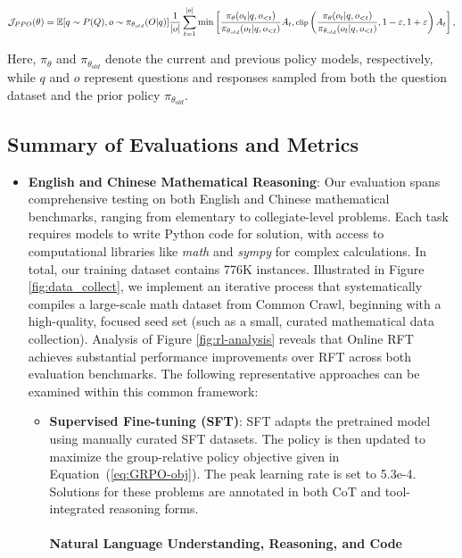 \begin{itemize}[topsep=0pt]
\begin{itemize}[topsep=0pt]
\begin{itemize}[topsep=0pt]
\begin{equation}
\begin{equation}
\footnotesize
            \mathcal{J}_{PPO}(\theta) = \mathbb{E}{[q \sim P(Q), o \sim \pi_{\theta_{old}}(O|q)]} \frac{1}{|o|} \sum_{t=1}^{|o|} \min \left[ \frac{\pi_\theta(o_{t} | q, o_{<t})}{\pi_{\theta_{old}}(o_{t} | q, o_{<t})} A_{t}, \text{clip} \left( \frac{\pi_\theta(o_{t} | q, o_{<t})}{\pi_{\theta_{old}}(o_{t} | q, o_{<t})}, 1 - \varepsilon, 1 + \varepsilon \right)  A_{t} \right] ,
\end{equation}

Here, $\pi_{\theta}$ and $\pi_{\theta_{old}}$ denote the current and previous policy models, respectively, while $q$ and $o$ represent questions and responses sampled from both the question dataset and the prior policy $\pi_{\theta_{old}}$. \end{itemize}

\subsection{Summary of Evaluations and Metrics}

\begin{itemize}[topsep=0pt]
    \item \textbf{English and Chinese Mathematical Reasoning}: Our evaluation spans comprehensive testing on both English and Chinese mathematical benchmarks, ranging from elementary to collegiate-level problems. Each task requires models to write Python code for solution, with access to computational libraries like \textit{math} and \textit{sympy} for complex calculations. In total, our training dataset contains 776K instances. Illustrated in Figure \ref{fig:data_collect}, we implement an iterative process that systematically compiles a large-scale math dataset from Common Crawl, beginning with a high-quality, focused seed set (such as a small, curated mathematical data collection). Analysis of Figure \ref{fig:rl-analysis} reveals that Online RFT achieves substantial performance improvements over RFT across both evaluation benchmarks. The following representative approaches can be examined within this common framework:

\begin{itemize}
    \item \textbf{Supervised Fine-tuning (SFT)}: SFT adapts the pretrained model using manually curated SFT datasets. The policy is then updated to maximize the group-relative policy objective given in Equation~(\ref{eq:GRPO-obj}). The peak learning rate is set to 5.3e-4. Solutions for these problems are annotated in both CoT and tool-integrated reasoning forms. \paragraph{Natural Language Understanding, Reasoning, and Code}


\end{itemize}
\end{itemize}
\end{itemize}
\end{itemize}
